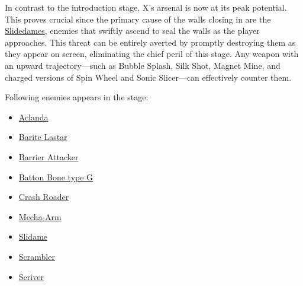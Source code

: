 In contrast to the introduction stage, X's arsenal is now at its peak potential. This proves crucial since the primary cause of the walls closing in are the  \hyperlink{enem:Slidame}{Slidedames}, enemies that swiftly ascend to seal the walls as the player approaches. This threat can be entirely averted by promptly destroying them as they appear on screen, eliminating the chief peril of this stage. Any weapon with an upward trajectory—such as Bubble Splash, Silk Shot, Magnet Mine, and charged versions of Spin Wheel and Sonic Slicer—can effectively counter them.

Following enemies appears in the stage:
\begin{itemize}
	\item \hyperlink{enem:Aclanda}{Aclanda}
	\item \hyperlink{enem:Barite_Lastar}{Barite Lastar}
	\item \hyperlink{enem:Barrier_Attacker}{Barrier Attacker}
	\item \hyperlink{enem:Batton_Bone_type_G}{Batton Bone type G}
	\item \hyperlink{enem:Crash_Roader}{Crash Roader}
	\item \hyperlink{enem:Mecha-Arm}{Mecha-Arm}
	\item \hyperlink{enem:Slidame}{Slidame}
	\item \hyperlink{enem:Scrambler}{Scrambler}
	\item \hyperlink{enem:Scriver}{Scriver}
\end{itemize}

